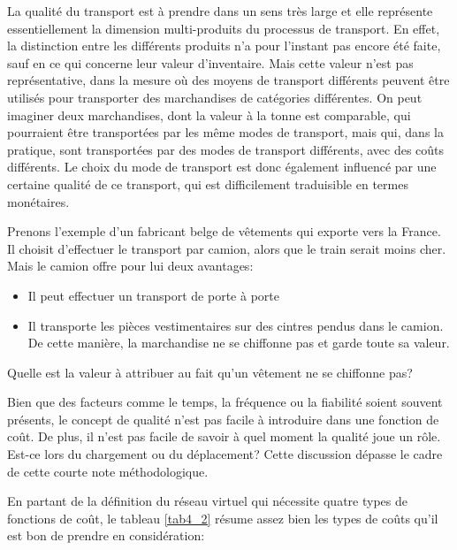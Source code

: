 La qualité du transport est à prendre dans un sens très large et
elle représente essentiellement la dimension multi-produits du
processus de transport. En effet, la distinction entre les
différents produits n'a pour l'instant pas encore été faite, sauf
en ce qui concerne leur valeur d'inventaire. Mais cette valeur
n'est pas représentative, dans la mesure où des moyens de transport
différents peuvent être utilisés pour transporter des marchandises
de catégories différentes. On peut imaginer deux marchandises, dont
la valeur à la tonne est comparable, qui pourraient être
transportées par les même modes de transport, mais qui, dans la
pratique, sont transportées par des modes de transport différents,
avec des coûts différents. Le choix du mode de transport est donc
également influencé par une certaine qualité de ce transport, qui
est difficilement traduisible en termes monétaires.

Prenons l'exemple d'un fabricant belge de vêtements qui exporte
vers la France. Il choisit d'effectuer le transport par camion,
alors que le train serait moins cher. Mais le camion offre pour lui
deux avantages:
\begin{itemize}
\item Il peut effectuer un transport de porte à porte
\item Il transporte les pièces vestimentaires sur des cintres pendus dans
le camion. De cette manière, la marchandise ne se chiffonne pas et
garde toute sa valeur.
\end{itemize}
Quelle est la valeur à attribuer au fait qu'un vêtement ne se
chiffonne pas?

Bien que des facteurs comme le temps, la fréquence ou la fiabilité
soient souvent présents, le concept de qualité n'est pas facile à
introduire dans une fonction de coût. De plus, il n'est pas facile
de savoir à quel moment la qualité joue un rôle. Est-ce lors du
chargement ou du déplacement? Cette discussion dépasse le
cadre de cette courte note méthodologique.

En partant de la définition du réseau virtuel qui nécessite quatre types de
fonctions de coût, le tableau \ref{tab4_2} résume assez bien les types de coûts
qu'il est bon de prendre en considération:

